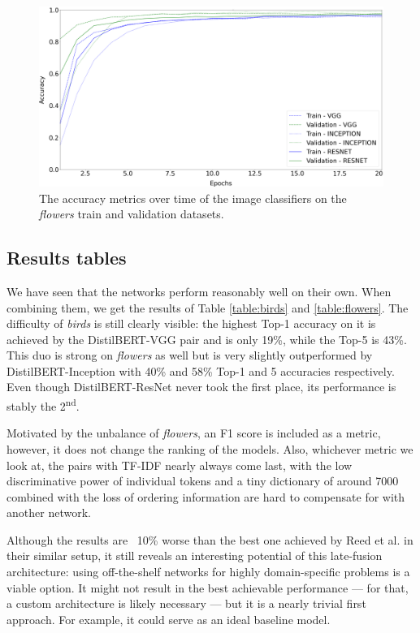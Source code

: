 \begin{figure}
  \centering
  \includegraphics[width=1 \linewidth]{figures/flowers-finetuning.png}
  \caption{The accuracy metrics over time of the image classifiers on the \textit{flowers} train and validation datasets.}
  \label{fig:flowers-fine-tuning}
\end{figure}

\subsection{Results tables}

We have seen that the networks perform reasonably well on their own. When combining them, we get the results of Table \ref{table:birds} and \ref{table:flowers}. The difficulty of \textit{birds} is still clearly visible: the highest Top-1 accuracy on it is achieved by the DistilBERT-VGG pair and is only 19\%, while the Top-5 is 43\%. This duo is strong on \textit{flowers} as well but is very slightly outperformed by DistilBERT-Inception with 40\% and 58\% Top-1 and 5 accuracies respectively. Even though DistilBERT-ResNet never took the first place, its performance is stably the 2\textsuperscript{nd}.

Motivated by the unbalance of \textit{flowers}, an F1 score is included as a metric, however, it does not change the ranking of the models. Also, whichever metric we look at, the pairs with TF-IDF nearly always come last, with the low discriminative power of individual tokens and a tiny dictionary of around 7000 combined with the loss of ordering information are hard to compensate for with another network.

Although the results are ~10\% worse than the best one achieved by Reed et al. \cite{reed2016learning} in their similar setup, it still reveals an interesting potential of this late-fusion architecture: using off-the-shelf networks for highly domain-specific problems is a viable option. It might not result in the best achievable performance --- for that, a custom architecture is likely necessary --- but it is a nearly trivial first approach. For example, it could serve as an ideal baseline model.


